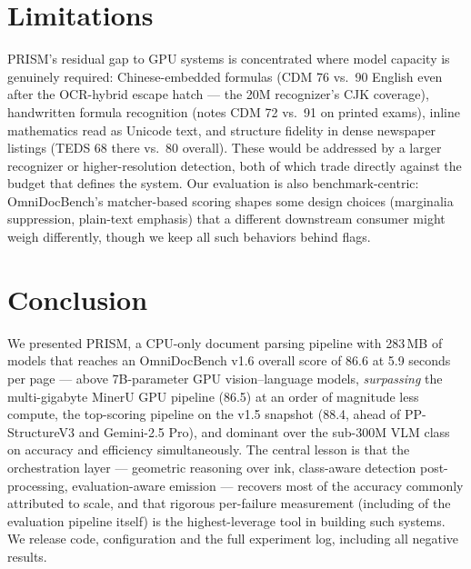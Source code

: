 \section{Limitations}
\label{sec:limitations}

PRISM's residual gap to GPU systems is concentrated where model capacity is genuinely required: Chinese-embedded formulas (CDM 76 vs.\ 90 English even after the OCR-hybrid escape hatch --- the 20M recognizer's CJK coverage), handwritten formula recognition (notes CDM 72 vs.\ 91 on printed exams), inline mathematics read as Unicode text, and structure fidelity in dense newspaper listings (TEDS 68 there vs.\ 80 overall). These would be addressed by a larger recognizer or higher-resolution detection, both of which trade directly against the budget that defines the system. Our evaluation is also benchmark-centric: OmniDocBench's matcher-based scoring shapes some design choices (marginalia suppression, plain-text emphasis) that a different downstream consumer might weigh differently, though we keep all such behaviors behind flags.

\section{Conclusion}
\label{sec:conclusion}

We presented PRISM, a CPU-only document parsing pipeline with 283\,MB of models that reaches an OmniDocBench v1.6 overall score of 86.6 at 5.9 seconds per page --- above 7B-parameter GPU vision--language models, \emph{surpassing} the multi-gigabyte MinerU GPU pipeline (86.5) at an order of magnitude less compute, the top-scoring pipeline on the v1.5 snapshot (88.4, ahead of PP-StructureV3 and Gemini-2.5 Pro), and dominant over the sub-300M VLM class on accuracy and efficiency simultaneously. The central lesson is that the orchestration layer --- geometric reasoning over ink, class-aware detection post-processing, evaluation-aware emission --- recovers most of the accuracy commonly attributed to scale, and that rigorous per-failure measurement (including of the evaluation pipeline itself) is the highest-leverage tool in building such systems. We release code, configuration and the full experiment log, including all negative results.
